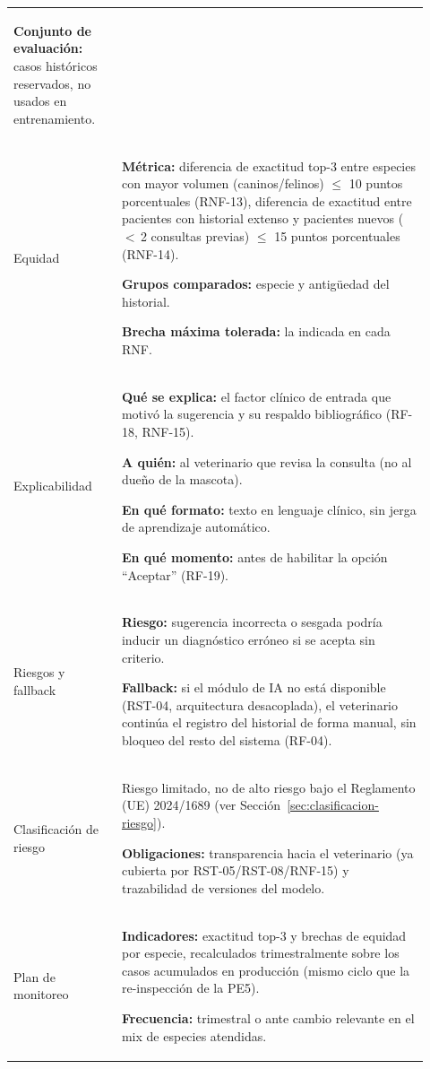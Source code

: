 \begin{longtable}{@{}>{\bfseries\raggedright\arraybackslash}p{0.24\linewidth} >{\raggedright\arraybackslash}p{0.68\linewidth}@{}}
\textbf{Conjunto de evaluación:} casos históricos reservados, no usados en entrenamiento. \\[4pt]

Equidad & \textbf{Métrica:} diferencia de exactitud top-3 entre especies con mayor volumen (caninos/felinos) $\leq$ 10 puntos porcentuales (RNF-13), diferencia de exactitud entre pacientes con historial extenso y pacientes nuevos ($<$\,2 consultas previas) $\leq$ 15 puntos porcentuales (RNF-14).

\textbf{Grupos comparados:} especie y antigüedad del historial.

\textbf{Brecha máxima tolerada:} la indicada en cada RNF. \\[4pt]

Explicabilidad & \textbf{Qué se explica:} el factor clínico de entrada que motivó la sugerencia y su respaldo bibliográfico (RF-18, RNF-15).

\textbf{A quién:} al veterinario que revisa la consulta (no al dueño de la mascota).

\textbf{En qué formato:} texto en lenguaje clínico, sin jerga de aprendizaje automático.

\textbf{En qué momento:} antes de habilitar la opción ``Aceptar'' (RF-19). \\[4pt]

Riesgos y fallback & \textbf{Riesgo:} sugerencia incorrecta o sesgada podría inducir un diagnóstico erróneo si se acepta sin criterio.

\textbf{Fallback:} si el módulo de IA no está disponible (RST-04, arquitectura desacoplada), el veterinario continúa el registro del historial de forma manual, sin bloqueo del resto del sistema (RF-04). \\[4pt]

Clasificación de riesgo & Riesgo limitado, no de alto riesgo bajo el Reglamento (UE) 2024/1689 (ver Sección~\ref{sec:clasificacion-riesgo}).

\textbf{Obligaciones:} transparencia hacia el veterinario (ya cubierta por RST-05/RST-08/RNF-15) y trazabilidad de versiones del modelo. \\[4pt]

Plan de monitoreo & \textbf{Indicadores:} exactitud top-3 y brechas de equidad por especie, recalculados trimestralmente sobre los casos acumulados en producción (mismo ciclo que la re-inspección de la PE5).

\textbf{Frecuencia:} trimestral o ante cambio relevante en el mix de especies atendidas.


\end{longtable}
